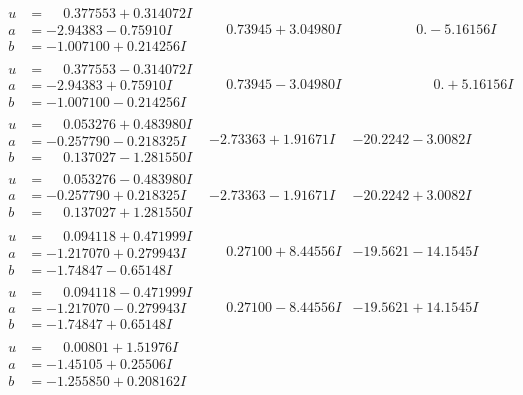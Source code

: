 \documentclass[1p]{elsarticle_modified}
\theoremstyle{definition}
\begin{document}
$$\begin{array}{c|c|c}
\begin{aligned}
u &= \phantom{-}0.377553 + 0.314072 I \\
a &= -2.94383 - 0.75910 I \\
b &= -1.007100 + 0.214256 I\end{aligned}
 & \phantom{-}0.73945 + 3.04980 I & \phantom{-0.000000 } 0. - 5.16156 I \\ \hline\begin{aligned}
u &= \phantom{-}0.377553 - 0.314072 I \\
a &= -2.94383 + 0.75910 I \\
b &= -1.007100 - 0.214256 I\end{aligned}
 & \phantom{-}0.73945 - 3.04980 I & \phantom{-0.000000 -}0. + 5.16156 I \\ \hline\begin{aligned}
u &= \phantom{-}0.053276 + 0.483980 I \\
a &= -0.257790 - 0.218325 I \\
b &= \phantom{-}0.137027 - 1.281550 I\end{aligned}
 & -2.73363 + 1.91671 I & -20.2242 - 3.0082 I \\ \hline\begin{aligned}
u &= \phantom{-}0.053276 - 0.483980 I \\
a &= -0.257790 + 0.218325 I \\
b &= \phantom{-}0.137027 + 1.281550 I\end{aligned}
 & -2.73363 - 1.91671 I & -20.2242 + 3.0082 I \\ \hline\begin{aligned}
u &= \phantom{-}0.094118 + 0.471999 I \\
a &= -1.217070 + 0.279943 I \\
b &= -1.74847 - 0.65148 I\end{aligned}
 & \phantom{-}0.27100 + 8.44556 I & -19.5621 - 14.1545 I \\ \hline\begin{aligned}
u &= \phantom{-}0.094118 - 0.471999 I \\
a &= -1.217070 - 0.279943 I \\
b &= -1.74847 + 0.65148 I\end{aligned}
 & \phantom{-}0.27100 - 8.44556 I & -19.5621 + 14.1545 I \\ \hline\begin{aligned}
u &= \phantom{-}0.00801 + 1.51976 I \\
a &= -1.45105 + 0.25506 I \\
b &= -1.255850 + 0.208162 I\end{aligned}

\end{array}$$
\end{document}

